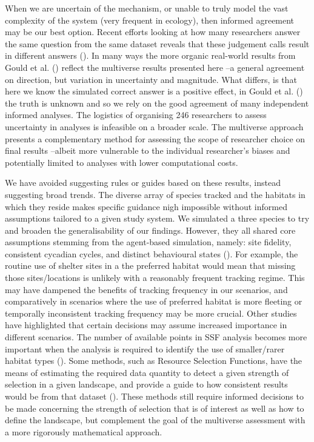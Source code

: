 \documentclass[10pt,a4paper]{article}
\begin{document}
When we are uncertain of the mechanism, or unable to truly model the vast complexity of the system (very frequent in ecology), then informed agreement may be our best option.
Recent efforts looking at how many researchers answer the same question from the same dataset reveals that these judgement calls result in different answers ().
In many ways the more organic real-world results from Gould et al. () reflect the multiverse results presented here --a general agreement on direction, but variation in uncertainty and magnitude.
What differs, is that here we know the simulated correct answer is a positive effect, in Gould et al. () the truth is unknown and so we rely on the good agreement of many independent informed analyses.
The logistics of organising 246 researchers to assess uncertainty in analyses is infeasible on a broader scale.
The multiverse approach presents a complementary method for assessing the scope of researcher choice on final results --albeit more vulnerable to the individual researcher's biases and potentially limited to analyses with lower computational costs.

We have avoided suggesting rules or guides based on these results, instead suggesting broad trends.
The diverse array of species tracked and the habitats in which they reside makes specific guidance nigh impossible without informed assumptions tailored to a given study system.
We simulated a three species to try and broaden the generalisability of our findings.
However, they all shared core assumptions stemming from the agent-based simulation, namely: site fidelity, consistent cycadian cycles, and distinct behavioural states ().
For example, the routine use of shelter sites in a the preferred habitat would mean that missing those sites/locations is unlikely with a reasonably frequent tracking regime.
This may have dampened the benefits of tracking frequency in our scenarios, and comparatively in scenarios where the use of preferred habitat is more fleeting or temporally inconsistent tracking frequency may be more crucial.
Other studies have highlighted that certain decisions may assume increased importance in different scenarios.
The number of available points in SSF analysis becomes more important when the analysis is required to identify the use of smaller/rarer habitat types ().
Some methods, such as Resource Selection Functions, have the means of estimating the required data quantity to detect a given strength of selection in a given landscape, and provide a guide to how consistent results would be from that dataset ().
These methods still require informed decisions to be made concerning the strength of selection that is of interest as well as how to define the landscape, but complement the goal of the multiverse assessment with a more rigorously mathematical approach.
\end{document}
